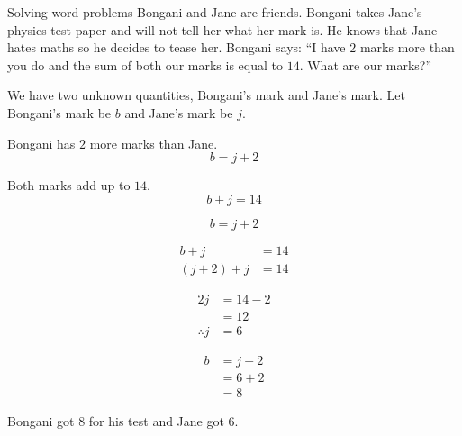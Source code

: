 \begin{wex}{Solving word problems}{%
Bongani and Jane are friends. Bongani takes Jane's physics test paper
and will not tell her what her mark is. He knows that Jane hates maths
so he decides to tease her. Bongani says: ``I have $2$ marks more than
you do and the sum of both our marks is equal to $14$. What are our
marks?''
}{
We have two unknown quantities, Bongani's mark and Jane's mark. Let
Bongani's mark be $b$ and Jane's mark be $j$.

Bongani has $2$ more marks than Jane.
\begin{equation*}
  b=j+2
\end{equation*}

Both marks add up to $14$.
\begin{equation*}
  b+j=14
\end{equation*}

\begin{equation*}
  b=j+2
\end{equation*}

\begin{align*}
  b+j &= 14 \\
  (j+2)+j &= 14
\end{align*}

\begin{align*}
  2j &= 14 - 2 \\
  &= 12 \\
  \therefore j &= 6
\end{align*}

\begin{align*}
  b &= j+2 \\
  &= 6+2 \\
  &= 8
\end{align*}


Bongani got $8$ for his test and Jane got $6$.
}
\end{wex}

